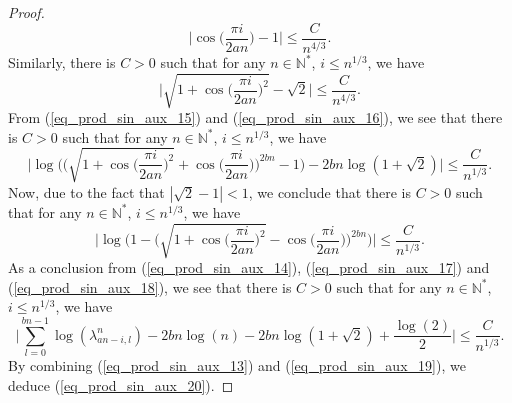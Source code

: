 \documentclass[10pt,a4paper]{amsart}
\newcommand{\nat}{\mathbb{N}}
\begin{document}
\begin{proof}
\begin{equation}
				\Big| \cos  \big( \frac{\pi i}{2 a n} \big) - 1 \Big| \leq \frac{C}{n^{4/3}}.
			\end{equation}
			Similarly, there is $C > 0$ such that for any $n \in \nat^*$, $i \leq  n^{1/3}$, we have
			\begin{equation}\label{eq_prod_sin_aux_16}
				\Big| \sqrt{ 1 + \cos  \big( \frac{\pi i}{2 a n} \big)^2} - \sqrt{2} \Big| \leq \frac{C}{n^{4/3}}.
			\end{equation}
			From (\ref{eq_prod_sin_aux_15}) and (\ref{eq_prod_sin_aux_16}), we see that there is $C > 0$ such that for any $n \in \nat^*$, $i \leq  n^{1/3}$, we have
			\begin{equation}\label{eq_prod_sin_aux_17}
				\bigg|
				\log 
				\Big(
					\Big( \sqrt{ 1 + \cos  \big( \frac{\pi i}{2 a n} \big)^2} + \cos  \big( \frac{\pi i}{2 a n} \big)  \Big)^{2bn} - 1
				\Big)
				-
				2bn \log(1 + \sqrt{2})
				\bigg|
				\leq
				\frac{C}{n^{1/3}}.
			\end{equation}
			Now, due to the fact that $|\sqrt{2} - 1| < 1$, we conclude that there is $C > 0$ such that for any $n \in \nat^*$, $i \leq  n^{1/3}$, we have
			\begin{equation}\label{eq_prod_sin_aux_18}
				\bigg|
				\log 
				\Big(
					1- \Big( \sqrt{ 1 + \cos  \big( \frac{\pi i}{2 a n} \big)^2} - \cos  \big( \frac{\pi i}{2 a n} \big)  \Big)^{2bn}
				\Big)
				\bigg|
				\leq
				\frac{C}{n^{1/3}}.
			\end{equation}
			As a conclusion from (\ref{eq_prod_sin_aux_14}), (\ref{eq_prod_sin_aux_17}) and (\ref{eq_prod_sin_aux_18}), we see that there is $C > 0$ such that for any $n \in \nat^*$, $i \leq  n^{1/3}$, we have
			\begin{equation}\label{eq_prod_sin_aux_19}
				\bigg|
				\sum_{l = 0}^{bn - 1} 
				\log(\lambda_{an-i, l}^{n})
				-
				2bn \log(n) 
				-
				2bn \log(1 + \sqrt{2})
				+
				\frac{\log(2)}{2}
				\bigg|
				\leq
				\frac{C}{n^{1/3}}.
			\end{equation}
			By combining (\ref{eq_prod_sin_aux_13}) and   (\ref{eq_prod_sin_aux_19}), we deduce (\ref{eq_prod_sin_aux_20}).
		\end{proof}
\end{document}

